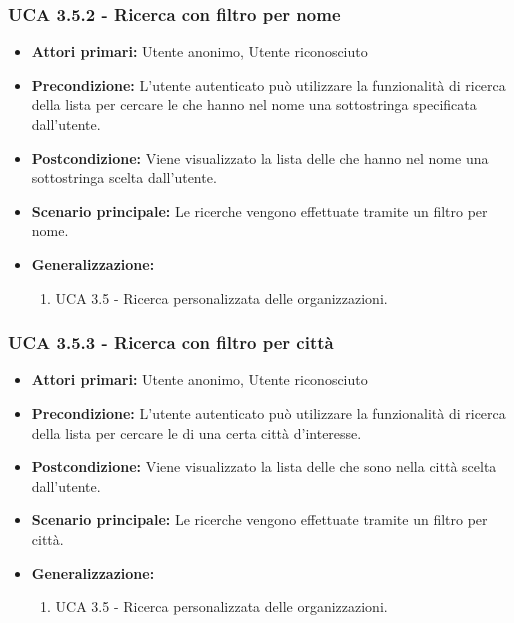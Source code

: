 \subsubsection{UCA 3.5.2 - Ricerca con filtro per nome}%
\begin{itemize}
	\item \textbf{Attori primari:} Utente anonimo, Utente riconosciuto
	\item \textbf{Precondizione:} L'utente autenticato può utilizzare la funzionalità di ricerca della lista per cercare le  che hanno nel nome una sottostringa specificata dall'utente.
	\item \textbf{Postcondizione:} Viene visualizzato la lista delle  che hanno nel nome una sottostringa scelta dall'utente.
	\item \textbf{Scenario principale:} Le ricerche vengono effettuate tramite un filtro per nome.
	\item \textbf{Generalizzazione:}
	\begin{enumerate}
	\item UCA 3.5 - Ricerca personalizzata delle organizzazioni.
	\end{enumerate}	
\end{itemize}

\subsubsection{UCA 3.5.3 - Ricerca con filtro per città}%
\begin{itemize}
	\item \textbf{Attori primari:} Utente anonimo, Utente riconosciuto
	\item \textbf{Precondizione:} L'utente autenticato può utilizzare la funzionalità di ricerca della lista per cercare le  di una certa città d'interesse.
	\item \textbf{Postcondizione:} Viene visualizzato la lista delle  che sono nella città scelta dall'utente.
	\item \textbf{Scenario principale:} Le ricerche vengono effettuate tramite un filtro per città.
	\item \textbf{Generalizzazione:}
	\begin{enumerate}
	\item UCA 3.5 - Ricerca personalizzata delle organizzazioni.
	\end{enumerate}	
\end{itemize}

